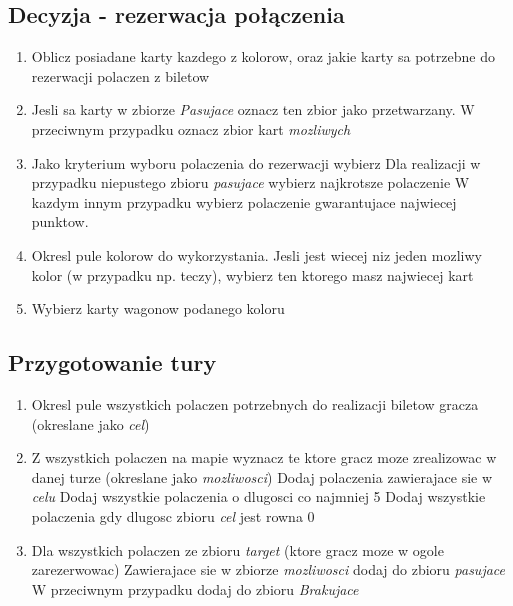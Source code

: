 \documentclass[12pt, oneside]{report}
\begin{document}
\subsection{Decyzja - rezerwacja połączenia}
\begin{enumerate}
	\item Oblicz posiadane karty kazdego z kolorow, oraz jakie karty sa potrzebne do rezerwacji polaczen z biletow
	\item Jesli sa karty w zbiorze \textit{Pasujace} oznacz ten zbior jako przetwarzany. W przeciwnym przypadku oznacz zbior kart \textit{mozliwych}
	\item Jako kryterium wyboru polaczenia do rezerwacji wybierz
	\subitem Dla realizacji w przypadku niepustego zbioru \textit{pasujace} wybierz najkrotsze polaczenie
	\subitem W kazdym innym przypadku wybierz polaczenie gwarantujace najwiecej punktow.
	
	\item Okresl pule kolorow do wykorzystania. Jesli jest wiecej niz jeden mozliwy kolor (w przypadku np. teczy), wybierz ten ktorego masz najwiecej kart
	\item Wybierz karty wagonow podanego koloru
\end{enumerate}
\subsection{Przygotowanie tury}
\begin{enumerate}
	\item Okresl pule wszystkich polaczen potrzebnych do realizacji biletow gracza (okreslane jako \textit{cel})
	\item Z wszystkich polaczen na mapie wyznacz te ktore gracz moze zrealizowac w danej turze (okreslane jako \textit{mozliwosci})
	\subitem Dodaj polaczenia zawierajace sie w \textit{celu}
	\subitem Dodaj wszystkie polaczenia o dlugosci co najmniej 5
	\subitem Dodaj wszystkie polaczenia gdy dlugosc zbioru \textit{cel} jest rowna 0
	\item Dla wszystkich polaczen ze zbioru \textit{target} (ktore gracz moze w ogole zarezerwowac)
	\subitem Zawierajace sie w zbiorze \textit{mozliwosci} dodaj do zbioru \textit{pasujace}
	\subitem W przeciwnym przypadku dodaj do zbioru \textit{Brakujace}
	
\end{enumerate}
\end{document}
